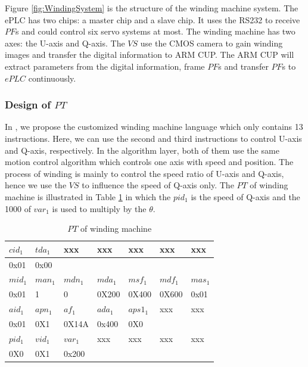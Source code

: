 \documentclass[journal,UTF8]{IEEEtran}
\begin{document}
Figure \ref{fig:WindingSystem} is the structure of the winding machine system. The ePLC has two chips: a master chip and a slave chip. It uses the RS232 to receive $PF$s and could control six servo systems at most. The winding machine has two axes: the U-axis and Q-axis. The $VS$ use the CMOS camera to gain winding images and transfer the digital information to ARM CUP. The ARM CUP will extract parameters from the digital information, frame $PF$s and transfer $PF$s to $ePLC$ continuously. 


\subsubsection{Design of $PT$}
In \cite{wu2018customized}, we propose the customized winding machine language which only contains 13 instructions. Here, we can use the second and third instructions to control U-axis and Q-axis, respectively. In the algorithm layer, both of them use the same motion control algorithm which controls one axis with speed and position. The process of winding is mainly to control the speed ratio of U-axis and Q-axis, hence we use the $VS$ to influence the speed of Q-axis only. The $PT$ of winding machine is illustrated in Table \ref{table:PTofWinding} in which the $pid_1$ is the speed of Q-axis and the 1000 of $var_1$ is used to multiply by the $\theta$.
\begin{table}
	\scriptsize \caption{$PT$ of winding machine}
	\label{table:PTofWinding}
	\begin{center}
		\renewcommand{\arraystretch}{1.4}
		\setlength\tabcolsep{3pt}
		\begin{tabular}{|p{1cm}|p{1cm}|p{1cm}|p{1cm}|p{1cm}|p{1cm}|p{1cm}|}
			\hline
			$cid_1$  & $tda_1$   &xxx &xxx& xxx  &xxx &xxx \\
			\hline
			0x01&0x00&& &&&\\
			\hline
			$mid_1$   & $man_1$ &$mdn_1$ &$mda_1$&$msf_1$& $mdf_1$  & $mas_1$\\
			\hline
			0x01      & 1     &   0    &0X200   &0X400   & 0X600  &0x01 \\
			\hline
			$aid_1$  & $apn_1$& $af_1$ &$ada_1$ &$aps1_1$  &xxx&xxx\\
			\hline
			0x01     & 0X1    & 0X14A  &0x400 &0X0   & &\\
			\hline
			$pid_1$  &$vid_1$ &$var_1$ &xxx      &xxx   &xxx &xxx\\
            \hline
			0X0      & 0X1    & 0x200   &         &   & &\\
	    	\hline
		\end{tabular}
	\end{center}
\end{table}
\end{document}
